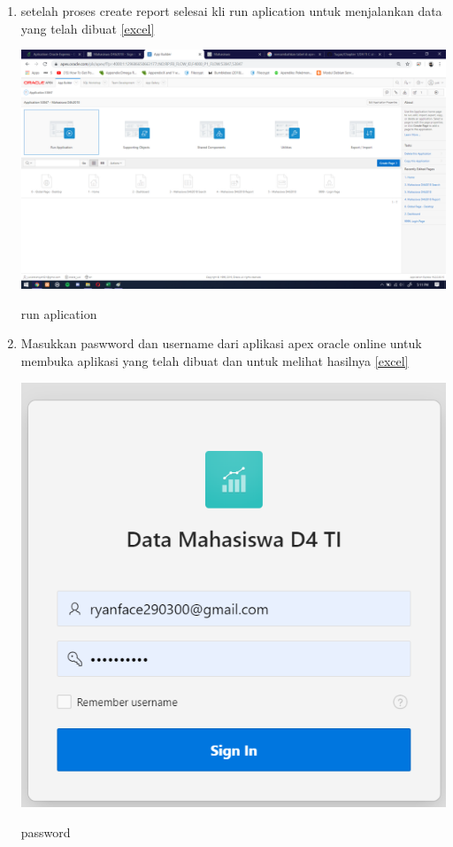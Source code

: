\documentclass{article}
\begin{document}
\begin{enumerate}
     \item setelah proses create report selesai kli run aplication untuk menjalankan data yang telah dibuat
      \ref{excel}
    \begin{center}
         \centering
            \includegraphics[scale=0.27]{figures/DB6.png}
        \caption{run aplication}
        \label{excel}
    \end{center}
    
      \item Masukkan paswword dan username dari aplikasi apex oracle online untuk membuka aplikasi yang telah dibuat dan untuk melihat hasilnya
      \ref{excel}
    \begin{center}
         \centering
            \includegraphics[scale=0.27]{figures/DB7.png}
        \caption{password}
        \label{excel}
    \end{center}
    
\end{enumerate}
\end{document}
